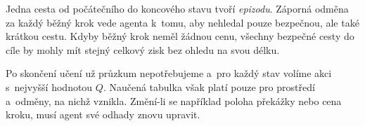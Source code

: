 Jedna cesta od počátečního do koncového stavu tvoří \emph{epizodu}. Záporná odměna za každý běžný krok vede agenta k~tomu, aby nehledal pouze bezpečnou, ale také krátkou cestu. Kdyby běžný krok neměl žádnou cenu, všechny bezpečné cesty do cíle by mohly mít stejný celkový zisk bez ohledu na svou délku.




Po skončení učení už průzkum nepotřebujeme a~pro každý stav volíme akci s~nejvyšší hodnotou \(Q\). Naučená tabulka však platí pouze pro prostředí a~odměny, na nichž vznikla. Změní-li se například poloha překážky nebo cena kroku, musí agent své odhady znovu upravit.
